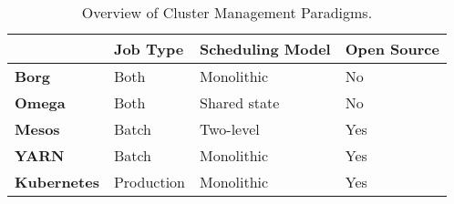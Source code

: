 
\begin{table}[]
\centering
\caption{Overview of Cluster Management Paradigms.}
\begin{tabular}{|l|l|l|l|}
\hline
                    & \textbf{Job Type} & \textbf{Scheduling Model} &
                    \textbf{Open Source} \\ \hline
\textbf{Borg}       & Both              & Monolithic                & No
\\ \hline
\textbf{Omega}      & Both              & Shared state              & No
\\ \hline
\textbf{Mesos}      & Batch             & Two-level                 & Yes
\\ \hline
\textbf{YARN}       & Batch             & Monolithic                & Yes
\\ \hline
\textbf{Kubernetes} & Production        & Monolithic                & Yes
\\ \hline
\end{tabular}
\end{table}

